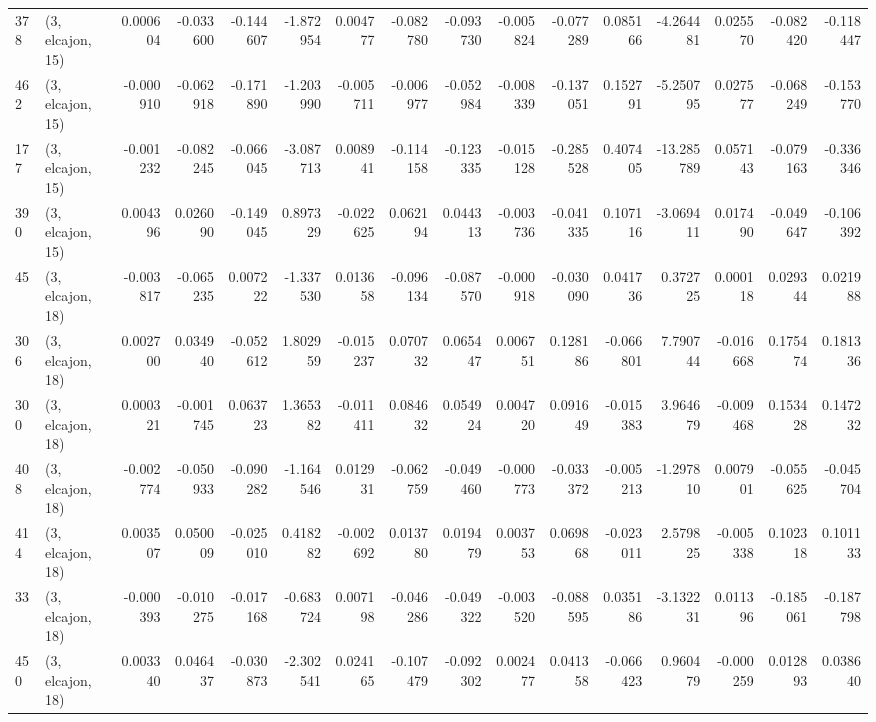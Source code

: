 \begin{tabular}{llrrrrrrrrrrrrrr}
378 &  (3, elcajon, 15) &   0.000604 & -0.033600 & -0.144607 &   -1.872954 &  0.004777 &  -0.082780 & -0.093730 & -0.005824 & -0.077289 &  0.085166 &   -4.264481 &  0.025570 & -0.082420 & -0.118447 \\
462 &  (3, elcajon, 15) &  -0.000910 & -0.062918 & -0.171890 &   -1.203990 & -0.005711 &  -0.006977 & -0.052984 & -0.008339 & -0.137051 &  0.152791 &   -5.250795 &  0.027577 & -0.068249 & -0.153770 \\
177 &  (3, elcajon, 15) &  -0.001232 & -0.082245 & -0.066045 &   -3.087713 &  0.008941 &  -0.114158 & -0.123335 & -0.015128 & -0.285528 &  0.407405 &  -13.285789 &  0.057143 & -0.079163 & -0.336346 \\
390 &  (3, elcajon, 15) &   0.004396 &  0.026090 & -0.149045 &    0.897329 & -0.022625 &   0.062194 &  0.044313 & -0.003736 & -0.041335 &  0.107116 &   -3.069411 &  0.017490 & -0.049647 & -0.106392 \\
45  &  (3, elcajon, 18) &  -0.003817 & -0.065235 &  0.007222 &   -1.337530 &  0.013658 &  -0.096134 & -0.087570 & -0.000918 & -0.030090 &  0.041736 &    0.372725 &  0.000118 &  0.029344 &  0.021988 \\
306 &  (3, elcajon, 18) &   0.002700 &  0.034940 & -0.052612 &    1.802959 & -0.015237 &   0.070732 &  0.065447 &  0.006751 &  0.128186 & -0.066801 &    7.790744 & -0.016668 &  0.175474 &  0.181336 \\
300 &  (3, elcajon, 18) &   0.000321 & -0.001745 &  0.063723 &    1.365382 & -0.011411 &   0.084632 &  0.054924 &  0.004720 &  0.091649 & -0.015383 &    3.964679 & -0.009468 &  0.153428 &  0.147232 \\
408 &  (3, elcajon, 18) &  -0.002774 & -0.050933 & -0.090282 &   -1.164546 &  0.012931 &  -0.062759 & -0.049460 & -0.000773 & -0.033372 & -0.005213 &   -1.297810 &  0.007901 & -0.055625 & -0.045704 \\
414 &  (3, elcajon, 18) &   0.003507 &  0.050009 & -0.025010 &    0.418282 & -0.002692 &   0.013780 &  0.019479 &  0.003753 &  0.069868 & -0.023011 &    2.579825 & -0.005338 &  0.102318 &  0.101133 \\
33  &  (3, elcajon, 18) &  -0.000393 & -0.010275 & -0.017168 &   -0.683724 &  0.007198 &  -0.046286 & -0.049322 & -0.003520 & -0.088595 &  0.035186 &   -3.132231 &  0.011396 & -0.185061 & -0.187798 \\
450 &  (3, elcajon, 18) &   0.003340 &  0.046437 & -0.030873 &   -2.302541 &  0.024165 &  -0.107479 & -0.092302 &  0.002477 &  0.041358 & -0.066423 &    0.960479 & -0.000259 &  0.012893 &  0.038640 \\

\end{tabular}
